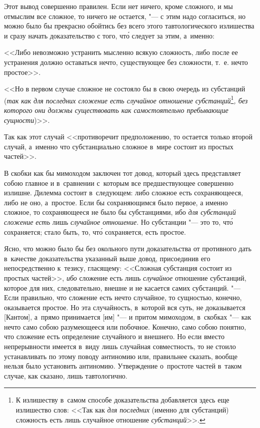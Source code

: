 Этот вывод совершенно правилен. Если нет ничего, кроме сложного, и мы
отмыслим все сложное, то ничего не остается, "--- с этим надо согласиться, но
можно было бы прекрасно обойтись без всего этого тавтологического излишества
и сразу начать доказательство с того, чт\'{о} следует за этим, а~именно:

<<Либо невозможно устранить мысленно всякую сложность, либо после ее устранения
должно оставаться нечто, существующее без сложности, т.~е. нечто простое>>.

<<Но в первом случае сложное не состояло бы в свою очередь из субстанций
({\em так как для последних сложение есть случайное
отношение субстанций}\footnote{К излишеству в~самом способе
доказательства добавляется здесь еще излишество слов: <<Так как
{\em для последних} (именно для субстанций) сложность есть лишь случайное
отношение {\em субстанций}>>.}{\em , без которого они должны
существовать как самостоятельно пребывающие сущности})>>.

Так как этот случай <<противоречит предположению, то остается
только второй случай, а~именно что субстанциально
сложное в~мире состоит из простых частей>>.

В скобки как бы мимоходом заключен тот довод, который здесь представляет
собою главное и в~сравнении с~которым все предшествующее совершенно излишне.
Дилемма состоит в~следующем: либо сложное есть сохраняющееся, либо не оно,
а~простое. Если бы сохраняющимся было первое, а именно сложное,
то сохраняющееся не было бы субстанциями, ибо {\em для субстанций
сложение есть} лишь {\em случайное отношение}. Но субстанции "--- это то,
чт\'{о} сохраняется; стало быть, то, чт\'{о} сохраняется, есть простое.

Ясно, что можно было бы без окольного пути доказательства от противного дать
в~качестве доказательства указанный выше довод, присоединив его
непосредственно к~тезису, гласящему: <<Сложная субстанция состоит из простых
частей>>, {\em ибо} сложение есть лишь {\em случайное} отношение субстанций,
которое для них, следовательно, внешне и не касается самих субстанций. "---
Если правильно, что сложение есть нечто случайное, то сущностью, конечно,
оказывается простое. Но эта случайность, в~которой вся суть, не доказывается
[Кантом], а~прямо принимается [им] "--- и притом мимоходом, в~скобках "--- как
нечто само собою разумеющееся или побочное. Конечно, само собою понятно, что
сложение есть определение случайного и внешнего. Но если вместо непрерывности
имеется в~виду лишь случайная совместность, то не стоило устанавливать
по этому поводу антиномию или, правильнее сказать, вообще нельзя было
установить антиномию. Утверждение о~простоте частей в~таком случае,
как сказано, лишь тавтологично.

